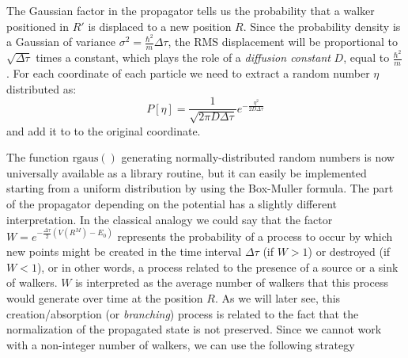 The Gaussian factor in the propagator tells us the probability that a walker positioned in $R'$ is displaced to a new position $R$. Since the probability density is a Gaussian of variance
$\sigma^2=\frac{\hbar^2}{m}\Delta\tau$, the RMS displacement will be proportional to $\sqrt{\Delta\tau}$ times a constant, which plays the role of a {\it diffusion constant} $D$, equal to $\frac{\hbar^2}{m}$. For each coordinate of each particle we need to extract a random number
$\eta$ distributed as:
\begin{equation}
\label{eq:gaussprop}
P[\eta]=\frac{1}{\sqrt{2\pi D \Delta\tau}}e^{-\frac{\eta^2}{2D\Delta\tau}}
\end{equation}
and add it to to the original coordinate. 
	\begin{algorithmic} 
		\EndFor
		\EndFor
	\end{algorithmic}
The function $\text{rgaus}()$ generating normally-distributed random numbers is now universally available as a library routine, but it can easily be implemented starting from a uniform distribution by using the Box-Muller formula. 
The part of the propagator depending on the potential has a slightly different interpretation. In the classical analogy we could say that the factor $W=e^{-\frac{\Delta\tau}{2}(V(R^M)-E_0)}$ represents 
the probability of a process to occur by which new points might be created in the time interval $\Delta\tau$ (if $W>1$) or destroyed (if $W<1$), or in other words, a process related to the presence of a source or a sink of walkers. $W$ is interpreted as the average number of walkers that this
process would generate over time at the position $R$. As we will later see, this creation/absorption (or {\it branching}) process is related to the fact that the normalization of the propagated state is not preserved.
Since we cannot work with a non-integer number of walkers, we can use the following strategy
